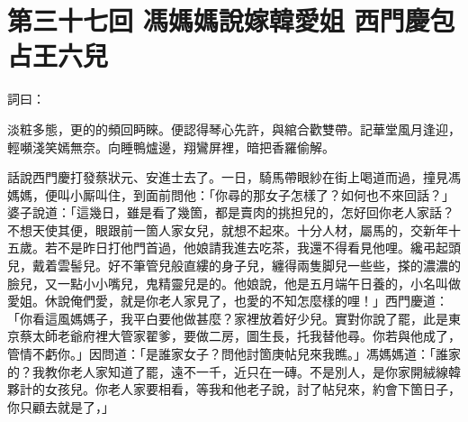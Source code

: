 
\chapter*{第三十七回 馮媽媽說嫁韓愛姐 西門慶包占王六兒}


詞曰：

\begin{myquote}
淡粧多態，更的的頻回眄睞。便認得琴心先許，與綰合歡雙帶。記華堂風月逢迎，輕嚬淺笑嫣無奈。向睡鴨爐邊，翔鸞屏裡，暗把香羅偷解。

\end{myquote}

話說西門慶打發蔡狀元、安進士去了。一日，騎馬帶眼紗在街上喝道而過，撞見馮媽媽，便叫小厮叫住，到面前問他：「你尋的那女子怎樣了？如何也不來回話？」婆子說道：「這幾日，雖是看了幾箇，都是賣肉的挑担兒的，怎好回你老人家話？不想天使其便，眼跟前一箇人家女兒，就想不起來。十分人材，屬馬的，交新年十五歲。若不是昨日打他門首過，他娘請我進去吃茶，我還不得看見他哩。纔弔起頭兒，戴着雲髻兒。好不筆管兒般直縷的身子兒，纏得兩隻脚兒一些些，搽的濃濃的臉兒，又一點小小嘴兒，鬼精靈兒是的。他娘說，他是五月端午日養的，小名叫做愛姐。休說俺們愛，就是你老人家見了，也愛的不知怎麼樣的哩！」西門慶道：「你看這風媽媽子，我平白要他做甚麼？家裡放着好少兒。實對你說了罷，此是東京蔡太師老爺府裡大管家翟爹，要做二房，圖生長，托我替他尋。你若與他成了，管情不虧你。」因問道：「是誰家女子？問他討箇庚帖兒來我瞧。」馮媽媽道：「誰家的？我教你老人家知道了罷，遠不一千，近只在一磚。不是別人，是你家開絨線韓夥計的女孩兒。你老人家要相看，等我和他老子說，討了帖兒來，約會下箇日子，你只顧去就是了，」

